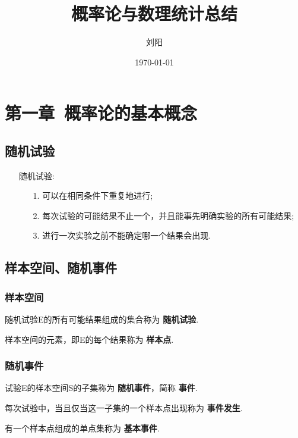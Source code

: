 \documentclass[UTF8,10pt]{ctexart}
\begin{document}
	\title{概率论与数理统计总结}
	\author{刘阳}
	\date{\today}
	\maketitle
	
	\tableofcontents
	
	\section{第一章\ 概率论的基本概念}
	
	\subsection{随机试验}
	
	\begin{itemize}
		\item [随机试验:] {
			\begin{enumerate}
				\item [1.] 可以在相同条件下重复地进行;
				\item [2.] 每次试验的可能结果不止一个，并且能事先明确实验的所有可能结果;
				\item [3.] 进行一次实验之前不能确定哪一个结果会出现.
			\end{enumerate}
		}
	\end{itemize}

	\subsection{样本空间、随机事件}
	
	\subsubsection{样本空间}
	
	随机试验E的所有可能结果组成的集合称为 \textbf{随机试验}.
	
	样本空间的元素，即E的每个结果称为 \textbf{样本点}.
	\subsubsection{随机事件}
	
	试验E的样本空间S的子集称为 \textbf{随机事件}，简称 \textbf{事件}.
	
	每次试验中，当且仅当这一子集的一个样本点出现称为 \textbf{事件发生}.
	
	有一个样本点组成的单点集称为 \textbf{基本事件}.
	
\end{document}
